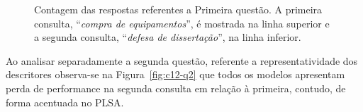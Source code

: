 \begin{figure}[!h]
	\caption{Contagem das respostas referentes a Primeira questão. A primeira consulta, ``\textit{compra de equipamentos}'', é mostrada na linha superior e a segunda consulta, ``\textit{defesa de dissertação}'', na linha inferior.}
	\label{fig:c12-q1}
\end{figure}



Ao analisar separadamente a segunda questão, referente a representatividade dos descritores observa-se na Figura~\ref{fig:c12-q2} que todos os modelos apresentam perda de performance 
na segunda consulta em relação à primeira,
contudo, de forma acentuada no PLSA. 



\begin{figure}[!h] \centering     %


\end{figure}
